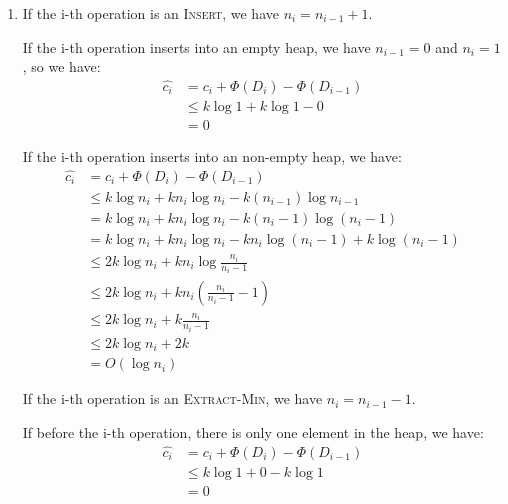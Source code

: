 \documentclass[12pt,a4paper]{article}
\makeatletter
\newtheorem*{solution}{Solution}
\theoremstyle{definition}
\renewenvironment{solution}[1][Solution] {\par\pushQED{\qed}\normalfont\topsep6\p@\@plus6\p@\relax\trivlist\item[\hskip\labelsep\bfseries#1\@addpunct{.}]\ignorespaces}{\popQED\endtrivlist\@endpefalse} \makeatother
\makeatother
\begin{document}
\begin{enumerate}
\begin{solution}
	If the i-th operation is an \textsc{Insert}, we have $n_i = n_{i-1} + 1$. 
	
	If the i-th operation inserts into an empty heap, we have $n_{i-1} = 0$ and $n_i = 1$, so we have:
	\begin{align*}
	\hat{c_i} &= c_i + \Phi(D_i) - \Phi(D_{i-1})\\
	&\leqslant k\log 1 + k\log 1 - 0\\
	&= 0
	\end{align*}
	
	If the i-th operation inserts into an non-empty heap, we have:
	\begin{align*}
	\hat{c_i} &= c_i + \Phi(D_i) - \Phi(D_{i-1})\\
	&\leqslant k\log n_i + kn_i\log n_i - k(n_{i-1})\log n_{i-1}\\
	&= k\log n_i + kn_i\log n_i - k(n_i-1)\log (n_i-1)\\
	&= k\log n_i + kn_i\log n_i - kn_i\log (n_i-1)+k\log (n_i-1)\\
	&\leqslant 2k\log n_i + kn_i \log \frac{n_i}{n_i - 1}\\
	&\leqslant 2k\log n_i + kn_i (\frac{n_i}{n_i - 1}-1)\\
	&\leqslant 2k\log n_i + k\frac{n_i}{n_i - 1}\\
	&\leqslant 2k\log n_i + 2k\\
	&= O(\log n_i)
	\end{align*}
	
	
	If the i-th operation is an \textsc{Extract-Min}, we have $n_i = n_{i-1} - 1$. 
	
	If before the i-th operation, there is only one element in the heap,  we have:
	\begin{align*}
	\hat{c_i} &= c_i + \Phi(D_i) - \Phi(D_{i-1})\\
	&\leqslant k\log 1 + 0 - k\log 1\\
	&= 0
	\end{align*}
	

\end{solution}
\end{enumerate}
\end{document}
